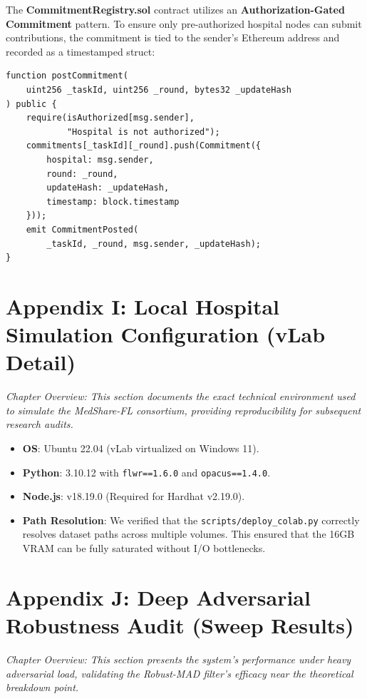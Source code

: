 \documentclass[10pt, a4paper, twocolumn]{article}
\begin{document}
The \textbf{CommitmentRegistry.sol} contract utilizes an \textbf{Authorization-Gated Commitment} pattern. To ensure only pre-authorized hospital nodes can submit contributions, the commitment is tied to the sender's Ethereum address and recorded as a timestamped struct:
\begin{lstlisting}[language=Solidity, caption={MedShare-FL Smart Contract Logic}]
function postCommitment(
    uint256 _taskId, uint256 _round, bytes32 _updateHash
) public {
    require(isAuthorized[msg.sender],
            "Hospital is not authorized");
    commitments[_taskId][_round].push(Commitment({
        hospital: msg.sender,
        round: _round,
        updateHash: _updateHash,
        timestamp: block.timestamp
    }));
    emit CommitmentPosted(
        _taskId, _round, msg.sender, _updateHash);
}
\end{lstlisting}

\section*{Appendix I: Local Hospital Simulation Configuration (vLab Detail)}
\textit{Chapter Overview: This section documents the exact technical environment used to simulate the MedShare-FL consortium, providing reproducibility for subsequent research audits.}

\begin{itemize}
    \item \textbf{OS}: Ubuntu 22.04 (vLab virtualized on Windows 11).
    \item \textbf{Python}: 3.10.12 with \texttt{flwr==1.6.0} and \texttt{opacus==1.4.0}.
    \item \textbf{Node.js}: v18.19.0 (Required for Hardhat v2.19.0).
    \item \textbf{Path Resolution}: We verified that the \texttt{scripts/deploy\_colab.py} correctly resolves dataset paths across multiple volumes. This ensured that the 16GB VRAM can be fully saturated without I/O bottlenecks.
\end{itemize}

\section*{Appendix J: Deep Adversarial Robustness Audit (Sweep Results)}
\textit{Chapter Overview: This section presents the system's performance under heavy adversarial load, validating the Robust-MAD filter's efficacy near the theoretical breakdown point.}
\end{document}
